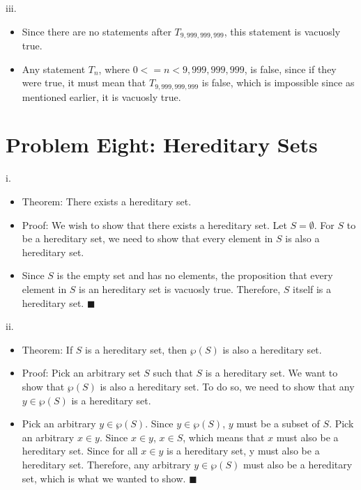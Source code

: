 \documentclass{article}
\renewcommand{\(}{\left(}
\renewcommand{\)}{\right)}
\newcommand{\powerset}[1]{\wp\left(#1\right)}
\theoremstyle{plain}
\theoremstyle{plain}
\theoremstyle{definition}
\begin{document}
    iii.
    \begin{shaded}
        \begin{itemize}
                        \item 
                            Since there are no statements after $T_{9,999,999,999}$, this statement is vacuosly true.
                        \item 
                            Any statement $T_{n}$, where $0<=n<9,999,999,999$, is false, since if they were true, it must mean that $T_{9,999,999,999}$ is false, which is impossible since as mentioned earlier, it is vacuosly true.
        \end{itemize}
    \end{shaded}

\newpage

\section*{Problem Eight: Hereditary Sets}
    i.
    \begin{shaded}
        \begin{itemize}
            \item 
                Theorem: There exists a hereditary set.
            \item 
                Proof: We wish to show that there exists a hereditary set. Let $S=\emptyset$. For $S$ to be a hereditary set, we need to show that every element in $S$ is also a hereditary set.
            \item 
                Since $S$ is the empty set and has no elements, the proposition that every element in $S$ is an hereditary set is vacuosly true. Therefore, $S$ itself is a hereditary set. $\blacksquare$
        \end{itemize}
    \end{shaded}
        
    ii.
    \begin{shaded}
        \begin{itemize}
            \item 
                Theorem: If $S$ is a hereditary set, then $\powerset{S}$ is also a hereditary set.
            \item 
                Proof: Pick an arbitrary set $S$ such that $S$ is a hereditary set. We want to show that $\powerset{S}$ is also a hereditary set. To do so, we need to show that any $y\in \powerset{S}$ is a hereditary set.
            \item 
                Pick an arbitrary $y\in \powerset{S}$. Since $y\in \powerset{S}$, $y$ must be a subset of $S$. Pick an arbitrary $x\in y$. Since $x\in y$, $x \in S$, which means that $x$ must also be a hereditary set. Since for all $x\in y$ is a hereditary set, y must also be a hereditary set. Therefore, any arbitrary $y\in \powerset{S}$ must also be a hereditary set, which is what we wanted to show. $\blacksquare$
        \end{itemize}
    \end{shaded}
    
\end{document}

